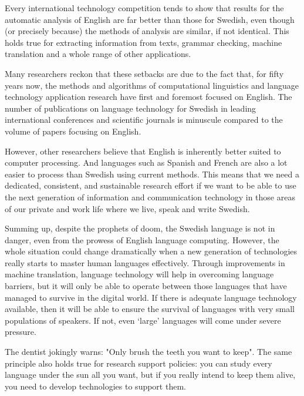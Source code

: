 \begin{multicols}{2}
Every international technology competition tends to show that results
for the automatic analysis of \mbox{English} are far better than those for
Swedish, even though (or precisely because) the methods of \mbox{analysis}
are similar, if not identical. This holds true for extracting
information from texts, grammar checking, machine translation and a
whole range of other applications.

Many researchers reckon that these setbacks are due to the fact that,
for fifty years now, the methods and algorithms of computational
linguistics and lang\-uage technology application research have first
and foremost focused on English. The number of publications on
language technology for Swedish in leading international conferences
and scientific journals is minuscule compared to the volume of \mbox{papers}
focus\-ing on English.
 
However, other researchers believe that English is inherently better
suited to computer processing. And languages such as Spanish and
French are also a lot easier to process than Swedish using current
methods. This means that we need a dedicated, consistent, and
sustainable research effort if we want to be able to use the next
generation of information and communication technology in those areas
of our \mbox{private} and work life where we live, speak and write Swedish.

Summing up, despite the prophets of doom, the Swedish language is not in
danger, even from the prowess of English language computing. However,
the whole situation could change dramatically when a new generation of
technologies really starts to master human languages
effectively. Through improvements in machine translation, language
technology will help in overcoming language barriers, but it will only
be able to operate between those languages that have managed to
survive in the digital world. If there is adequate language technology
available, then it will be able to ensure the survival of languages
with very small populations of speakers. If not, even ‘large’
languages will come under severe pressure.

The dentist jokingly warns: "Only brush the teeth you want to
keep". The same principle also holds true for research support policies: you can
study every language under the sun all you want, but if you really intend
to keep them alive, you need to develop technologies to support them.

\end{multicols}


